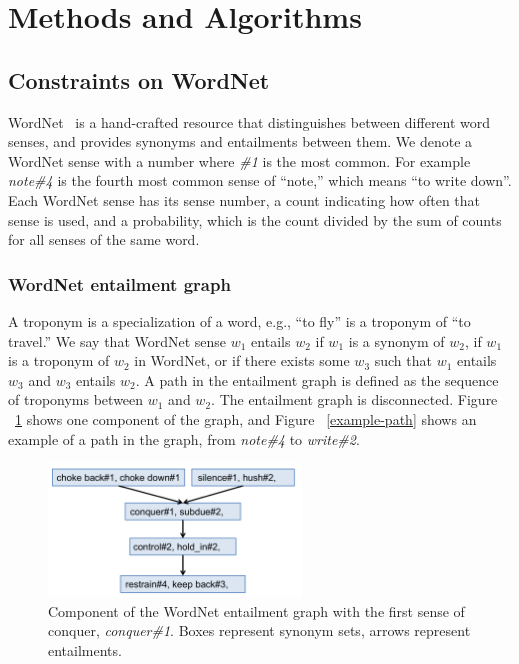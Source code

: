 \documentclass{article}
\begin{document}
\section{Methods and Algorithms}

\subsection{Constraints on WordNet}

WordNet~\cite{fellbaum98wordnet} is a hand-crafted resource that distinguishes between different word senses, and provides synonyms and entailments between them. We denote a WordNet sense with a number where \textit{\#1} is the most common. For example \textit{note\#4} is the fourth most common sense of ``note,'' which means ``to write down''. Each WordNet sense has its sense number, a count indicating how often that sense is used, and a probability, which is the count divided by the sum of counts for all senses of the same word.

\subsubsection{WordNet entailment graph}
A troponym is a specialization of a word, e.g., ``to fly'' is a troponym of ``to travel.'' We say that WordNet sense $w_1$ entails $w_2$ if $w_1$ is a synonym of $w_2$, if $w_1$ is a troponym of $w_2$ in WordNet, or if there exists some $w_3$ such that $w_1$ entails $w_3$ and $w_3$ entails $w_2$. A path in the entailment graph is defined as the sequence of troponyms between $w_1$ and $w_2$. The entailment graph is disconnected. Figure ~\ref{wordnet-graph} shows one component of the graph, and Figure ~\ref{example-path} shows an example of a path in the graph, from \textit{note\#4} to \textit{write\#2}.

\begin{figure}[h]
\begin{center}
\includegraphics[width=0.6\textwidth]{figures/wordnet-graph.pdf}
\end{center}
\caption{Component of the WordNet entailment graph with the first sense of conquer, \textit{conquer\#1}. Boxes represent synonym sets, arrows represent entailments.}\label{wordnet-graph}
\end{figure}
\end{document}
